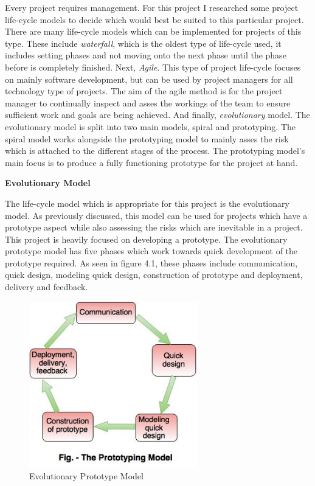 Every project requires management. For this project I researched some project life-cycle models to decide which would best be suited to this particular project. There are many life-cycle models which can be implemented for projects of this type. These include \textit{waterfall}, which is the oldest type of life-cycle used, it includes setting phases and not moving onto the next phase until the phase before is completely finished. Next, \textit{Agile}. This type of project life-cycle focuses on mainly software development, but can be used by project managers for all technology type of projects. The aim of the agile method is for the project manager to continually inspect and asses the workings of the team to ensure sufficient work and goals are being achieved. And finally, \textit{evolutionary} model. The evolutionary model is split into two main models, spiral and prototyping. The spiral model works alongside the prototyping model to mainly asses the risk which is attached to the different stages of the process. The prototyping model's main focus is to produce a fully functioning prototype for the project at hand. 

\vspace{5mm}
\textbf{\large Evolutionary Model}

The life-cycle model which is appropriate for this project is the evolutionary model. As previously discussed, this model can be used for projects which have a prototype aspect while also assessing the risks which are inevitable in a project. This project is heavily focused on developing a prototype. The evolutionary prototype model has five phases which work towards quick development of the prototype required. As seen in figure 4.1, these phases include communication, quick design, modeling quick design, construction of prototype and deployment, delivery and feedback.



\begin{figure}[ht]
    \centering
      \includegraphics[width=0.65\textwidth]{Figures/PrototypeModel.jpg}
  \caption[prototype model]{Evolutionary Prototype Model \cite{Reference19}}
  \label{fig:Prototype Model}
\end{figure}

